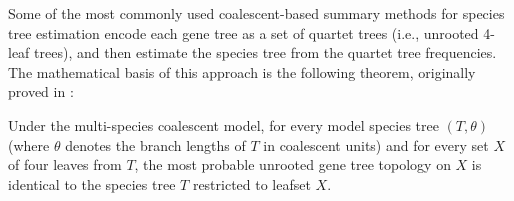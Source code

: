 





Some of the most commonly used coalescent-based summary
methods for species tree estimation encode each gene tree as a set of quartet
trees (i.e., 
unrooted 4-leaf trees), and then estimate the species tree from
the quartet tree frequencies.
The mathematical  basis of this approach
is the following theorem, originally proved in \cite{Allman}:
\begin{theorem}
Under the multi-species coalescent model, 
for every
model 
species tree $(T,\theta)$
(where $\theta$ denotes the branch lengths of $T$ in
coalescent units) and for every
set $X$ of
four leaves from $T$,  the most probable
unrooted
gene tree topology on $X$ is identical to the
species tree $T$ restricted to leafset $X$.
\label{hgt::theorem1}
\end{theorem}

